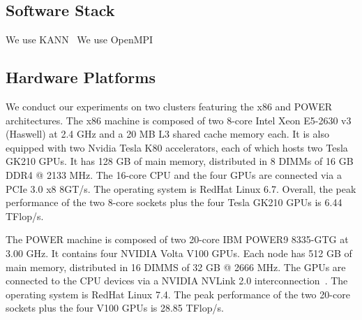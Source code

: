 \subsection{Software Stack}
\label{sec:altsplit_software}
We use KANN~\cite{kann} 
We use OpenMPI~\cite{openmpi, openmpi1}

\subsection{Hardware Platforms}
\label{sec:altsplit_platform}
We conduct our experiments on two clusters featuring the x86 and POWER 
architectures.
The x86 machine is composed of two 8-core Intel Xeon
\textregistered E5-2630 v3 (Haswell) at 2.4 GHz and a 20 MB L3 shared cache 
memory each.  It is also equipped with two Nvidia Tesla K80 accelerators, each 
of which hosts two Tesla GK210 GPUs.
It has 128 GB of main memory, distributed in 8 DIMMs of 16 GB DDR4 @ 2133 MHz.
The 16-core CPU and the four GPUs are connected via a PCIe 3.0 x8 8GT/s.
The operating system is RedHat Linux 6.7.
Overall, the peak performance of the two 8-core sockets plus the four Tesla 
GK210 GPUs is 6.44 TFlop/s.

The POWER machine is composed of two 20-core IBM POWER9 8335-GTG at 3.00 GHz.  
It contains four NVIDIA Volta V100 GPUs.  
Each node has 512 GB of main memory, distributed in 16 DIMMS of 32 GB @ 2666 
MHz.  The GPUs are connected to the CPU devices via a NVIDIA NVLink 2.0 
interconnection~\cite{nvlink}.  The operating system is RedHat Linux 7.4.  The 
peak performance of the two 20-core sockets plus the four V100 GPUs is 28.85 
TFlop/s.
